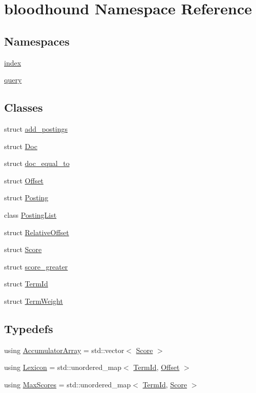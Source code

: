 \hypertarget{namespacebloodhound}{}\section{bloodhound Namespace Reference}
\label{namespacebloodhound}
\subsection*{Namespaces}
\begin{DoxyCompactItemize}
\item 
 \hyperlink{namespacebloodhound_1_1index}{index}
\item 
 \hyperlink{namespacebloodhound_1_1query}{query}
\end{DoxyCompactItemize}
\subsection*{Classes}
\begin{DoxyCompactItemize}
\item 
struct \hyperlink{structbloodhound_1_1add__postings}{add\+\_\+postings}
\item 
struct \hyperlink{structbloodhound_1_1Doc}{Doc}
\item 
struct \hyperlink{structbloodhound_1_1doc__equal__to}{doc\+\_\+equal\+\_\+to}
\item 
struct \hyperlink{structbloodhound_1_1Offset}{Offset}
\item 
struct \hyperlink{structbloodhound_1_1Posting}{Posting}
\item 
class \hyperlink{classbloodhound_1_1PostingList}{Posting\+List}
\item 
struct \hyperlink{structbloodhound_1_1RelativeOffset}{Relative\+Offset}
\item 
struct \hyperlink{structbloodhound_1_1Score}{Score}
\item 
struct \hyperlink{structbloodhound_1_1score__greater}{score\+\_\+greater}
\item 
struct \hyperlink{structbloodhound_1_1TermId}{Term\+Id}
\item 
struct \hyperlink{structbloodhound_1_1TermWeight}{Term\+Weight}
\end{DoxyCompactItemize}
\subsection*{Typedefs}
\begin{DoxyCompactItemize}
\item 
using \hyperlink{namespacebloodhound_ae863daa54e3092bd2bc335e70f7a9dd7}{Accumulator\+Array} = std\+::vector$<$ \hyperlink{structbloodhound_1_1Score}{Score} $>$
\item 
using \hyperlink{namespacebloodhound_a94032a3533df0a1b6d3435bad57e6499}{Lexicon} = std\+::unordered\+\_\+map$<$ \hyperlink{structbloodhound_1_1TermId}{Term\+Id}, \hyperlink{structbloodhound_1_1Offset}{Offset} $>$
\item 
using \hyperlink{namespacebloodhound_a687d80c6f992eba8b820bf30a482f4b4}{Max\+Scores} = std\+::unordered\+\_\+map$<$ \hyperlink{structbloodhound_1_1TermId}{Term\+Id}, \hyperlink{structbloodhound_1_1Score}{Score} $>$
\end{DoxyCompactItemize}
